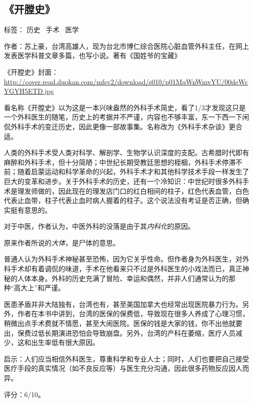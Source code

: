 \subsection{《开膛史》}

标签： 历史 \ 手术 \  医学

作者：苏上豪，台湾高雄人，现为台北市博仁综合医院心脏血管外科主任，在网上发表医学科普文章多篇，也写小说。著有《国姓爷的宝藏》

《开膛史》封面：\url{http://cover.read.duokan.com/mfsv2/download/s010/p01MuWnWmvYU/00deWcYGYH5ETD.jpg}

看名称《开膛史》以为这是一本兴味盎然的外科手术简史，看了1/3才发现这只是一个外科医生的随笔，历史上的考据并不严谨，内容也不够丰富，东一下西一下闲侃外科手术的变迁历史，因此更像一部故事集。名称改为《外科手术杂谈》更合适。

人类的外科手术受人类对科学、解剖学、生物学认识深度的支配。古希腊时代即有麻醉和外科手术，但十分简陋；中世纪长期受教廷思想的桎棝，外科手术停滞不前；随着启蒙运动和科学革命的兴起，外科手术才和其他科学技术手段一样发生了巨大的变革和进步。关于外科手术的历史，还有一个冷知识：中世纪时很多外科手术是理发师做的，因此现在的理发店门口的红白相间的柱子，红色代表血管，白色代表止血带，柱子代表止血时病人握着的柱子。这个说法没有考证是否正确，但确实挺有意思的。

对于中医，作者认为，中医外科的没落是由于其\emph{内科化}的原因。

原来作者所说的\emph{大体}，是尸体的意思。

普通人认为外科手术神秘甚至恐怖，因为它关乎性命。但作者身为外科医生，对外科手术却有着调侃的味道，手术在他看来只不过是外科医生的小戏法而已，真正神秘的人体本身。外科的历史充满了冒险、幸运和偶然，并非人们通常认为的那种“高大上”和严谨。

医患矛盾并非大陆独有，台湾也有，甚至美国加拿大也经常出现医院暴力行为。另外，作者在本书中讲到，台湾的医保的保费低，导致现在很多人养成了心理习惯，稍微出点手术费就不情愿，甚至大闹医院。医保的钱是大家的钱，你不出他就要出，保费过低长期演进恐怕会导致崩盘。另外，台湾的产科在萎缩，医疗人员减少，这和出生率低有很大原因。

启示：人们应当相信外科医生，尊重科学和专业人士；同时，人们也要把自己接受医疗手段的真实情况（如不良反应等）与医生充分沟通，因此很多药物反应因人而异。

评分：6/10。